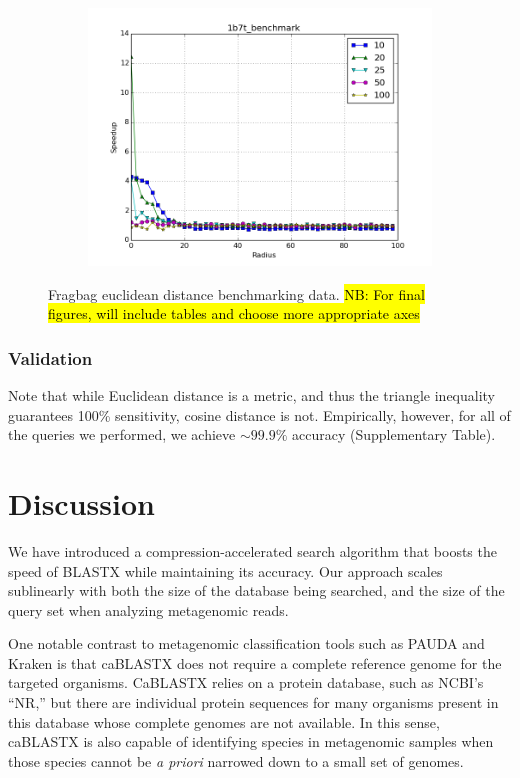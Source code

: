 \documentclass{amsbook}
\theoremstyle{definition}
\theoremstyle{remark}
\numberwithin{equation}{section}
\begin{document}
\begin{figure}[tbp]
\begin{subfigure}[b]{0.49\textwidth}
        \includegraphics[width=1\textwidth]{assets/1b7t_benchmark_euclid}
        \caption{}
    \end{subfigure}
    \caption{Fragbag euclidean distance benchmarking data. \hl{NB: For final figures, will include tables and choose more appropriate axes}}
    \label{fig:fragbag_euclid}
\end{figure}


\subsection*{Validation}
Note that while Euclidean distance is a metric, and thus the triangle inequality guarantees 100\% sensitivity, cosine distance is not.
Empirically, however, for all of the queries we performed, we achieve $\sim 99.9\%$ accuracy (Supplementary Table).

\chapter*{Discussion}

We have introduced a compression-accelerated search algorithm that boosts the
speed of BLASTX while maintaining its accuracy.
Our approach scales sublinearly with both the size of the database being
searched, and the size of the query set when analyzing metagenomic reads.

One notable contrast to metagenomic classification tools such as PAUDA and
Kraken is that caBLASTX does not require a complete reference genome for the
targeted organisms.
CaBLASTX relies on a protein database, such as NCBI's ``NR,'' but there are
individual protein sequences for many organisms present in this database whose
complete genomes are not available.
In this sense, caBLASTX is also capable of identifying species in metagenomic
samples when those species cannot be \emph{a priori} narrowed down to a small
set of genomes.
\end{document}
